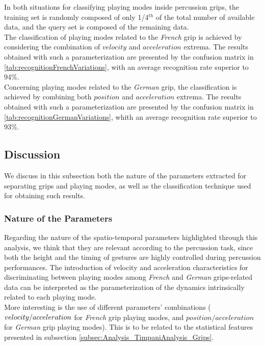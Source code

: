 In both situations for classifying playing modes inside percussion grips, the training set is randomly composed of only 1/4$^{th}$ of the total number of available data, and the query set is composed of the remaining data.\\ 

The classification of playing modes related to the \emph{French} grip is achieved by considering the combination of $velocity$ and $acceleration$ extrema. The results obtained with such a parameterization are presented by the confusion matrix in \mytabname \ref{tab:recognitionFrenchVariations}, with an average recognition rate superior to 94{\%}.\\

Concerning playing modes related to the \emph{German} grip, the classification is achieved by combining both $position$ and $acceleration$ extrema. The results obtained with such a parameterization are presented by the confusion matrix in \mytabname \ref{tab:recognitionGermanVariations}, whith an average recognition rate superior to 93{\%}.


		\subsection{Discussion}
		\label{subsec:Analysis_Discussion}

We discuss in this subsection both the nature of the parameters extracted for separating grips and playing modes, as well as the classification technique used for obtaining such results.


			\subsubsection{Nature of the Parameters}
			\label{subsubsec:Analysis_Discussion_Parameters}
			
Regarding the nature of the spatio-temporal parameters highlighted through this analysis, we think that they are relevant according to the percussion task, since both the height and the timing of gestures are highly controlled during percussion performances. The introduction of velocity and acceleration characteristics for discriminating between playing modes among \emph{French} and \emph{German} grips-related data can be interpreted as the parameterization of the dynamics intrinsically related to each playing mode.\\

More interesting is the use of different parameters' combinations ($velocity/ \\ acceleration$ for \emph{French} grip playing modes, and $position/acceleration$ for \emph{German} grip playing modes). This is to be related to the statistical features presented in subsection \ref{subsec:Analysis_TimpaniAnalysis_Grips}.

